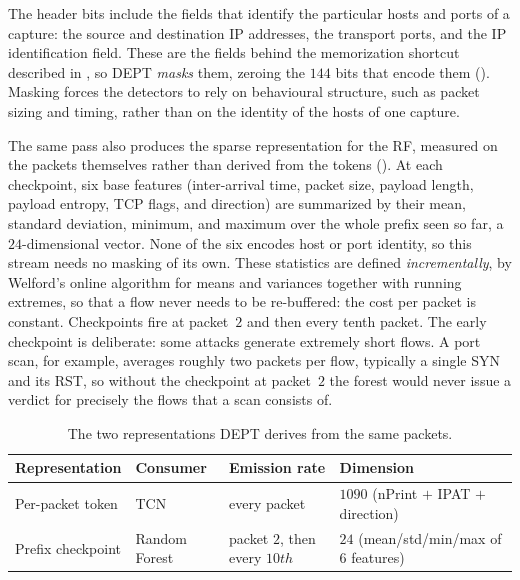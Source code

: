 The header bits include the fields that identify the particular hosts and ports of a
capture: the source and destination IP addresses, the transport ports, and the IP
identification field. These are the fields behind the memorization shortcut described
in , so DEPT \emph{masks} them, zeroing the $144$ bits that
encode them (). Masking forces the detectors to rely on behavioural
structure, such as packet sizing and timing, rather than on the identity of the hosts
of one capture.

The same pass also produces the sparse representation for the \ac{RF}, measured on the
packets themselves rather than derived from the tokens (). At each
checkpoint, six base features (inter-arrival time, packet size, payload length, payload
entropy, TCP flags, and direction) are summarized by their mean, standard deviation,
minimum, and maximum over the whole prefix seen so far, a $24$-dimensional vector.
None of the six encodes host or port identity, so this stream needs no masking of its own.
These statistics are defined \emph{incrementally}, by Welford's online algorithm for
means and variances together with running extremes, so that a flow never needs to be
re-buffered: the cost per packet is constant. Checkpoints fire at packet~$2$ and
then every tenth packet. The early checkpoint is deliberate: some attacks generate
extremely short flows. A port scan, for example, averages roughly two packets per flow,
typically a single SYN and its RST, so without the checkpoint at packet~$2$ the forest
would never issue a verdict for precisely the flows that a scan consists of.

\begin{table}[htbp]
    \centering
    \caption{The two representations DEPT derives from the same packets.}
    \label{tab:bg-streams}
    \begin{tabular}{@{}llll@{}}
        \toprule
        \textbf{Representation} & \textbf{Consumer} & \textbf{Emission rate} & \textbf{Dimension} \\
        \midrule
        Per-packet token   & TCN           & every packet                 & $1090$ (nPrint $+$ IPAT $+$ direction) \\
        Prefix checkpoint  & Random Forest & packet $2$, then every $10th$   & $24$ (mean/std/min/max of $6$ features) \\
        \bottomrule
    \end{tabular}
\end{table}

